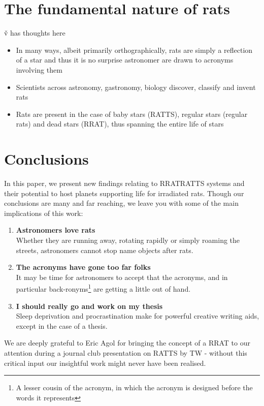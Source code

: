 \documentclass[twocolumn, twocolappendix]{aastex631}
\newcommand{\tauriRAT}{RATTS\xspace}
\newcommand{\radioRAT}{RRAT\xspace}
\newcommand{\binaryRAT}{RRATRATTS\xspace}
\begin{document}

\section{The fundamental nature of rats}\label{sec:fundamental_rats}
\v{v has thoughts here}
\begin{itemize}
    \item In many ways, albeit primarily orthographically, rats are simply a reflection of a star and thus it is no surprise astronomer are drawn to acronyms involving them
    \item Scientists across astronomy, gastronomy, biology discover, classify and invent rats
    \item Rats are present in the case of baby stars (\tauriRAT), regular stars (regular rats) and dead stars (\radioRAT), thus spanning the entire life of stars
\end{itemize}


\section*{Conclusions}%
In this paper, we present new findings relating to \binaryRAT systems and their potential to host planets supporting life for irradiated rats. Though our conclusions are many and far reaching, we leave you with some of the main implications of this work:
\begin{enumerate}
    \item \textbf{Astronomers love rats}\\Whether they are running away, rotating rapidly or simply roaming the streets, astronomers cannot stop name objects after rats.
    \item \textbf{The acronyms have gone too far folks}\\It may be time for astronomers to accept that the acronyms, and in particular back-ronyms\footnote{A lesser cousin of the acronym, in which the acronym is designed before the words it represents} are getting a little out of hand.
    \item \textbf{I should really go and work on my thesis}\\Sleep deprivation and procrastination make for powerful creative writing aids, except in the case of a thesis.
\end{enumerate}


\begin{acknowledgements}
    We are deeply grateful to Eric Agol for bringing the concept of a \radioRAT{} to our attention during a journal club presentation on \tauriRAT{} by TW - without this critical input our insightful work might never have been realised.
\end{acknowledgements}
\end{document}

